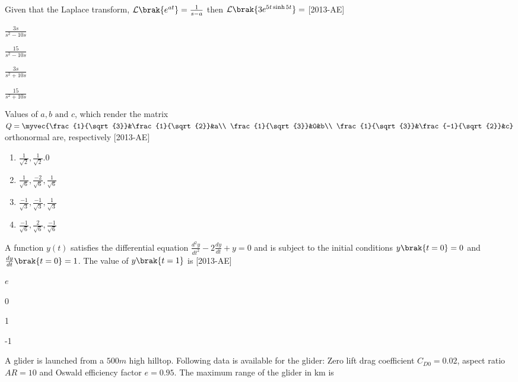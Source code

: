 \iffalse
    \title{Assignment}
    \author{EE24BTECH11066}
    \section{ae}
    \chapter{2013}
  \fi
\item Given that the Laplace transform, $\mathcal{L}\brak{e^{at}}=\frac{1}{s-a}$ then $\mathcal{L}\brak{3e^{5t \sinh{5t}}}=$ \hfill{[2013-AE]}
\begin{enumerate}
\begin{multicols}{4}
\item $\frac{3s}{s^2-10s}$
\item $\frac{15}{s^2-10s}$
\item $\frac{3s}{s^2+10s}$
\item $\frac{15}{s^2+10s}$
\end{multicols}
\end{enumerate}
\item Values of $a,b \text{ and } c$, which render the matrix\\
$Q=\myvec{\frac{1}{\sqrt{3}}&\frac{1}{\sqrt{2}}&a\\ \frac{1}{\sqrt{3}}&0&b\\ \frac{1}{\sqrt{3}}&\frac{-1}{\sqrt{2}}&c}$\\
orthonormal are, respectively \hfill{[2013-AE]}
\begin{enumerate}
    \item $\frac{1}{\sqrt{2}},\frac{1}{\sqrt{2}}.0$\\
    \item $\frac{1}{\sqrt{6}},\frac{-2}{\sqrt{6}},\frac{1}{\sqrt{6}}$\\
    \item $\frac{-1}{\sqrt{3}},\frac{-1}{\sqrt{3}},\frac{1}{\sqrt{3}}$\\
    \item $\frac{-1}{\sqrt{6}},\frac{2}{\sqrt{6}},\frac{-1}{\sqrt{6}}$
\end{enumerate}
\item  A function $y(t)$ satisfies the differential equation $\frac{d^2 y}{dt^2}-2\frac{dy}{dt}+y=0$ and is subject to the initial conditions $y\brak{t=0}=0$ and $\frac{dy}{dt}\brak{t=0}=1$. The value of $y\brak{t=1}$ is \hfill{[2013-AE]}
\begin{enumerate}
\begin{multicols}{4}
\item $e$
\item 0
\item 1
\item -1
\end{multicols}
\end{enumerate}
\item A glider is launched from a $500m$ high hilltop. Following data is available for the glider: Zero lift drag coefficient $C_{D0}=0.02$, aspect ratio $AR=10$ and Oswald efficiency factor $e=0.95$. The maximum range of the glider in km is \underline{\hspace{1cm}}\\

